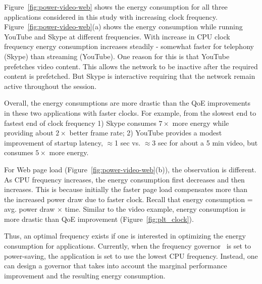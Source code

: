 Figure~\ref{fig:power-video-web}
shows the energy consumption for all three applications
considered in this study with increasing 
clock frequency. Figure~\ref{fig:power-video-web}(a) shows the energy consumption while running YouTube and Skype at different frequencies. With increase in CPU clock frequency energy consumption increases steadily - somewhat faster for telephony (Skype) than streaming (YouTube). One reason for this is that YouTube prefetches video content. This allows the network to be inactive after the required content is prefetched. But Skype is interactive requiring that the network remain active throughout the session. 

Overall, the energy consumptions are more
drastic than the QoE improvements in these two applications
with faster clocks. For example, from the slowest end to fastest
end of clock frequency 1) Skype consumes $7\times$ more 
energy  while providing about $2\times$ better
frame rate; 2)  YouTube provides a modest
improvement of startup latency, $\approx$1 sec vs. 
$\approx$3 sec for about a 5 min video, but consumes
$5\times$ more energy. 

For Web page load (Figure~\ref{fig:power-video-web}(b)), 
the observation is different. As CPU frequency increases, the 
energy consumption first decreases and then increases. This 
is because initially the faster page load compensates
more than the increased power draw due to faster 
clock. Recall that 
energy consumption = avg. power draw $\times$ time. Similar to the video example, energy consumption is more drastic than QoE improvement (Figure~\ref{fig:plt_clock}). %

Thus, an optimal frequency exists if one is interested
in optimizing the energy consumption for applications. Currently, when the frequency governor~\cite{ad-governors} is set to power-saving, the application is set to use the lowest CPU frequency. Instead, one can design a governor that takes into account the marginal performance improvement and the resulting energy consumption. 

